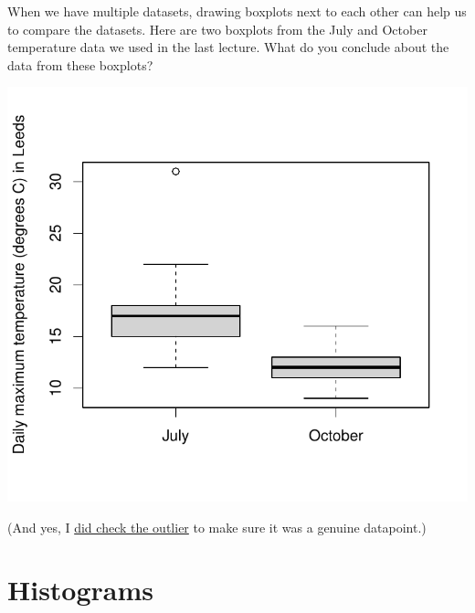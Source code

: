 \documentclass[
  a4paper,
]{book}
\newenvironment{Shaded}{\begin{snugshade}}{\end{snugshade}}
\newcommand{\AttributeTok}[1]{\textcolor[rgb]{0.77,0.63,0.00}{#1}}
\newcommand{\FunctionTok}[1]{\textcolor[rgb]{0.00,0.00,0.00}{#1}}
\newcommand{\NormalTok}[1]{#1}
\newcommand{\SpecialCharTok}[1]{\textcolor[rgb]{0.00,0.00,0.00}{#1}}
\newcommand{\StringTok}[1]{\textcolor[rgb]{0.31,0.60,0.02}{#1}}
\theoremstyle{definition}
\theoremstyle{definition}
\theoremstyle{definition}
\theoremstyle{definition}
\theoremstyle{remark}
\begin{document}
When we have multiple datasets, drawing boxplots next to each other can help us to compare the datasets. Here are two boxplots from the July and October temperature data we used in the last lecture. What do you conclude about the data from these boxplots?

\begin{Shaded}
\end{Shaded}

\begin{center}\includegraphics{math1710_files/figure-latex/boxplot-temp-1} \end{center}

(And yes, I \href{https://www.metoffice.gov.uk/binaries/content/assets/metofficegovuk/pdf/weather/learn-about/uk-past-events/interesting/2020/2020_05_july_temperature.pdf}{did check the outlier} to make sure it was a genuine datapoint.)

\hypertarget{histograms}{%
\section{Histograms}\label{histograms}}
\end{document}
